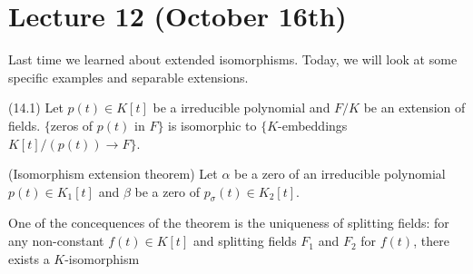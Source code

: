 \section{Lecture 12 (October 16th)}
\begin{rmk}
Last time we learned about extended isomorphisms. Today, we will look at some specific examples and separable extensions. 
\end{rmk}
\vspace{2ex}
\begin{prop}
(14.1) Let $p(t)\in K[t]$ be a irreducible polynomial and $F/K$ be an extension of fields. $\{$zeros of $p(t)$ in $F$$\}$ is isomorphic to $\{$$K$-embeddings $K[t]/(p(t))\rightarrow F$$\}$.
\end{prop}
\vspace{2ex}

\begin{thm}
(Isomorphism extension theorem) Let $\alpha $ be a zero of an irreducible polynomial $p(t)\in K_1[t]$ and $\beta $ be a zero of $p_{\sigma }(t)\in K_2[t]$. 
\begin{center}
\end{center}
One of the concequences of the theorem is the uniqueness of splitting fields: for any non-constant $f(t)\in K[t]$ and splitting fields $F_1$ and $F_2$ for $f(t)$, there exists a $K$-isomorphism
\begin{center}
\end{center}
\end{thm}
